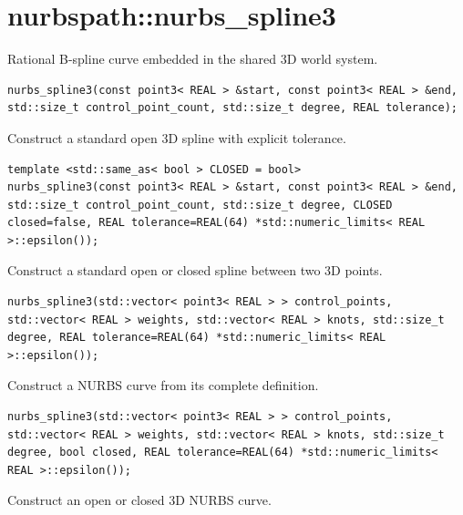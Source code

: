 \section{nurbspath::nurbs\_spline3}
Rational B-spline curve embedded in the shared 3D world system.
\par\noindent\begin{minipage}{\linewidth}
\begin{lstlisting}[style=apireference]
nurbs_spline3(const point3< REAL > &start, const point3< REAL > &end, std::size_t control_point_count, std::size_t degree, REAL tolerance);
\end{lstlisting}
{\footnotesize Construct a standard open 3D spline with explicit tolerance.\par}
\end{minipage}\par\vspace{1pt}
\par\noindent\begin{minipage}{\linewidth}
\begin{lstlisting}[style=apireference]
template <std::same_as< bool > CLOSED = bool>
nurbs_spline3(const point3< REAL > &start, const point3< REAL > &end, std::size_t control_point_count, std::size_t degree, CLOSED closed=false, REAL tolerance=REAL(64) *std::numeric_limits< REAL >::epsilon());
\end{lstlisting}
{\footnotesize Construct a standard open or closed spline between two 3D points.\par}
\end{minipage}\par\vspace{1pt}
\par\noindent\begin{minipage}{\linewidth}
\begin{lstlisting}[style=apireference]
nurbs_spline3(std::vector< point3< REAL > > control_points, std::vector< REAL > weights, std::vector< REAL > knots, std::size_t degree, REAL tolerance=REAL(64) *std::numeric_limits< REAL >::epsilon());
\end{lstlisting}
{\footnotesize Construct a NURBS curve from its complete definition.\par}
\end{minipage}\par\vspace{1pt}
\par\noindent\begin{minipage}{\linewidth}
\begin{lstlisting}[style=apireference]
nurbs_spline3(std::vector< point3< REAL > > control_points, std::vector< REAL > weights, std::vector< REAL > knots, std::size_t degree, bool closed, REAL tolerance=REAL(64) *std::numeric_limits< REAL >::epsilon());
\end{lstlisting}
{\footnotesize Construct an open or closed 3D NURBS curve.\par}
\end{minipage}\par\vspace{1pt}
